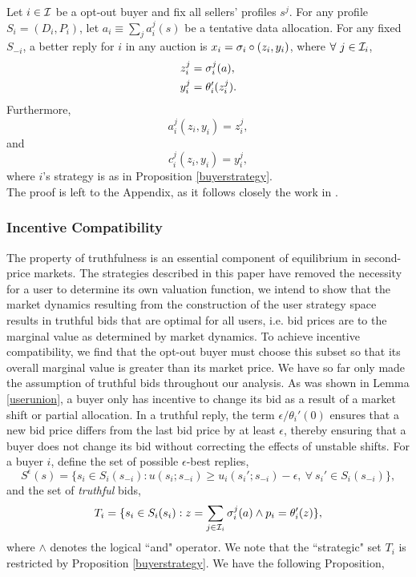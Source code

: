 {
\label{coordinationlemma} 
Let $i\in\mathcal{I}$ be a opt-out buyer and fix all sellers' profiles $s^j$.
For any profile $S_i = (D_i, P_i)$, let $a_i \equiv \sum_j a_i^j(s)$ be a
tentative data
allocation. For any fixed $S_{-i}$, a better reply for $i$ in any auction is $x_i =
\sigma_i \circ (z_i,y_i)$, where $\forall \ j \in \mcI_i$,
\begin{align*}
    z_i^j &= \sigma_i^{j}(a), \\
    y_i^j &= \theta_i'(z_i^j).
\end{align*}
Furthermore,
\begin{equation}\label{allocationcoordination}
    a_i^j(z_i,y_i) = z_i^{j},
\end{equation}
and
\begin{equation}\label{costcoordination}
    c_i^j(z_i,y_i) = y_i^{j},
\end{equation}
where $i$'s strategy is as in Proposition \ref{buyerstrategy}.
}\\
The proof is left to the Appendix, as it follows closely the work in
\cite{semret}.

\subsubsection{Incentive Compatibility}

The property of truthfulness is an essential component of equilibrium in
second-price markets. The strategies described in this paper have removed the
necessity for a user to determine its own valuation function, we intend to show that the market dynamics resulting from the
construction of the user strategy space results in truthful bids that are optimal for all users,
i.e. bid prices are to the marginal value as determined by market dynamics. 
To achieve incentive compatibility, we find that the opt-out buyer must choose
this subset so that its overall marginal value is greater than its market price.
We have so far only made the assumption of truthful bids throughout our analysis. As was shown in Lemma \ref{userunion}, a buyer only
has incentive to change its bid as a result of a market shift or partial
allocation. In a truthful reply, the term $\epsilon/\theta_i'(0)$
ensures that a new bid price differs from the last bid price by at least
$\epsilon$, thereby ensuring that a buyer does not change its bid without
correcting the effects of unstable shifts.
For a buyer $i$, define the set of possible $\epsilon$-best replies,
\begin{equation}\label{e-bid}
    S^\epsilon(s) = \lbrace s_i\in S_i(s_{-i}) : u(s_i;s_{-i}) \ge
u_i(s_i';s_{-i}) -\epsilon, \ \forall \ s_i'\in S_i(s_{-i})\rbrace,
\end{equation}
and the set of \emph{truthful} bids, 
\begin{equation}\label{t-bid}
    T_i = \lbrace s_i\in S_i(s_i) : z=\displaystyle\sum_{j\in\mathcal{I}_i} \sigma_i^j(a)
\wedge p_i = \theta_i'(z)\rbrace,
\end{equation}
where $\wedge$ denotes the logical ``and" operator. We note that the ``strategic" set $T_i$
is restricted by Proposition \ref{buyerstrategy}.
We have the following Proposition, 

